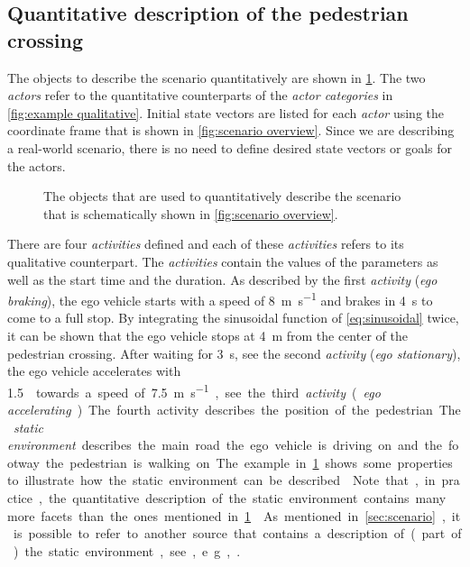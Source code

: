 \subsection{Quantitative description of the pedestrian crossing}
\label{sec:example quantitative}

The objects to describe the scenario quantitatively are shown in \cref{fig:example quantitative}. The two \textit{actors} refer to the quantitative counterparts of the \textit{actor categories} in \cref{fig:example qualitative}. Initial \cstart state vectors \cend are listed for each \textit{actor} using the coordinate frame that is shown in \cref{fig:scenario overview}. 
Since we are describing a real-world scenario, there is no need to define desired \cstart state vectors \cend or goals for the actors.


\begin{figure}
	\centering
	
	\caption{The objects that are used to quantitatively describe the scenario that is schematically shown in \cref{fig:scenario overview}.}
	\label{fig:example quantitative}
\end{figure}

There are four \textit{activities} defined and each of these \textit{activities} refers to its qualitative counterpart. The \textit{activities} contain the values of the parameters as well as the start time and the duration. As described by the first \textit{activity} (\emph{ego braking}), the ego vehicle starts with a speed of \SI{8}{\meter\per\second} and brakes in \SI{4}{\second} to come to a full stop. By integrating the sinusoidal function of \cref{eq:sinusoidal} twice, it can be shown that the ego vehicle stops at \SI{4}{\meter} from the center of the pedestrian crossing. After waiting for \SI{3}{\second}, see the second \textit{activity} (\emph{ego stationary}), the ego vehicle accelerates with \SI{1.5}{\meter\per\second\square} towards a speed of \SI{7.5}{\meter\per\second}, see the third \textit{activity} (\emph{ego accelerating}). The fourth activity describes the position of the pedestrian.

The \textit{static environment} describes the main road the ego vehicle is driving on and the footway the pedestrian is walking on. The example in \cref{fig:example quantitative} shows some properties to illustrate how the static environment can be described. \cstart Note that, in practice, the quantitative description of the static environment contains many more facets than the ones mentioned in \cref{fig:example quantitative}. \cend As mentioned in \cref{sec:scenario}, it is possible to refer to another source that contains a description of (part of) the static environment, see, e.g., \autocite{dupuis2010opendrive}. 

